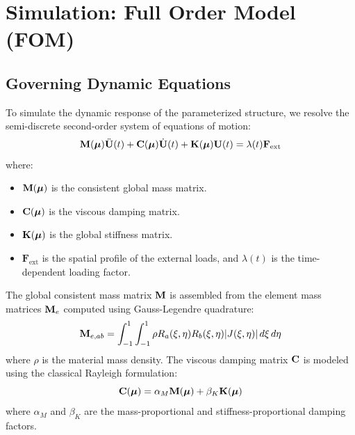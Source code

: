 \chapter{Simulation: Full Order Model (FOM)}
\label{ch:fom}

\section{Governing Dynamic Equations}
To simulate the dynamic response of the parameterized structure, we resolve the semi-discrete second-order system of equations of motion:
\begin{equation}
        \mathbf{M}(\boldsymbol{\mu}) \ddot{\mathbf{U}}(t) + \mathbf{C}(\boldsymbol{\mu}) \dot{\mathbf{U}}(t) + \mathbf{K}(\boldsymbol{\mu}) \mathbf{U}(t) = \lambda(t) \mathbf{F}_{\text{ext}}
\end{equation}
where:
\begin{itemize}
    \item $\mathbf{M}(\boldsymbol{\mu})$ is the consistent global mass matrix.
    \item $\mathbf{C}(\boldsymbol{\mu})$ is the viscous damping matrix.
    \item $\mathbf{K}(\boldsymbol{\mu})$ is the global stiffness matrix.
    \item $\mathbf{F}_{\text{ext}}$ is the spatial profile of the external loads, and $\lambda(t)$ is the time-dependent loading factor.
\end{itemize}

The global consistent mass matrix $\mathbf{M}$ is assembled from the element mass matrices $\mathbf{M}_{e}$ computed using Gauss-Legendre quadrature:
\begin{equation}
        \mathbf{M}_{e, ab} = \int_{-1}^{1} \int_{-1}^{1} \rho R_a(\xi, \eta) R_b(\xi, \eta) |J(\xi, \eta)| \, d\xi \, d\eta
\end{equation}
where $\rho$ is the material mass density. The viscous damping matrix $\mathbf{C}$ is modeled using the classical Rayleigh formulation:
\begin{equation}
        \mathbf{C}(\boldsymbol{\mu}) = \alpha_M \mathbf{M}(\boldsymbol{\mu}) + \beta_K \mathbf{K}(\boldsymbol{\mu})
\end{equation}
where $\alpha_M$ and $\beta_K$ are the mass-proportional and stiffness-proportional damping factors.

